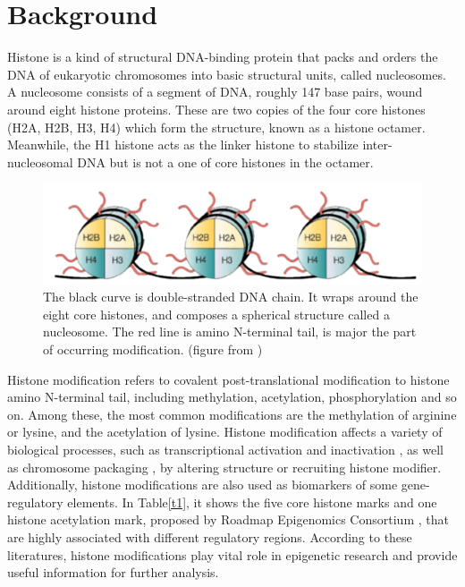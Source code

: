 \hspace{24pt}

\section{Background}
Histone is a kind of structural DNA-binding protein that packs and orders the DNA of eukaryotic chromosomes into basic structural units, called nucleosomes. A nucleosome consists of a segment of DNA, roughly 147 base pairs, wound around eight histone proteins. These are two copies of the four core histones (H2A, H2B, H3, H4) which form the structure, known as a histone octamer. Meanwhile, the H1 histone acts as the linker histone to stabilize inter-nucleosomal DNA but is not a one of core histones in the octamer.

\begin{figure}[H]
    \centering
    \includegraphics[width=1\columnwidth]{body/figure/figure1.png}
    \captionsetup{labelfont=bf}
    \renewcommand{\baselinestretch}{1.0}
    \caption[Structure of nucleosome]{The black curve is double-stranded DNA chain. It wraps around the eight core histones, and composes a spherical structure called a nucleosome. The red line is amino N-terminal tail, is major the part of occurring modification. (figure from \cite{marks2001histone})}
    \label{f1}
\end{figure}

Histone modification refers to covalent post-translational modification to histone amino N-terminal tail, including methylation, acetylation, phosphorylation and so on. Among these, the most common modifications are the methylation of arginine or lysine, and the acetylation of lysine. Histone modification affects a variety of biological processes, such as transcriptional activation and inactivation \cite{luger1997crystal}, as well as chromosome packaging \cite{peterson2004histones}, by altering structure \cite{allfrey1964acetylation} or recruiting histone modifier. Additionally, histone modifications are also used as biomarkers of some gene-regulatory elements. In Table\ref{t1}, it shows the five core histone marks and one histone acetylation mark, proposed by Roadmap Epigenomics Consortium \cite{kundaje2015integrative}, that are highly associated with different regulatory regions. According to these literatures, histone modifications play vital role in epigenetic research and provide useful information for further analysis.

